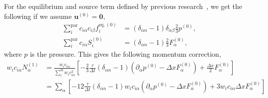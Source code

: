 \documentclass[fleqn,a4paper]{article} %
\numberwithin{equation}{section} %
\numberwithin{figure}{section} %
\numberwithin{table}{section} %
\numberwithin{algorithm}{section} %
\begin{document}
For the equilibrium and source term defined by previous research~\cite{saito_generalized_2023}, we get the following if we assume $\bm{u}^{(0)} = \bm{0}$,
\begin{equation}
\begin{split}
    \sum_i^\text{par}c_{i\alpha}c_{i\beta}f_i^{\text{eq},(0)} &= (\delta_{\alpha n} - 1)\delta_{\alpha\beta}\frac{2}{3}p^{(0)},\\
    \sum_i^\text{par}c_{i\alpha}S_i^{(0)} &= (\delta_{\alpha n} - 1)\frac{2}{3}F_\alpha^{(0)},
\end{split}
\end{equation}
where $p$ is the pressure. This gives the following momentum correction,
\begin{equation}
\begin{split}
    w_i c_{i\alpha}N_\alpha^{(1)} &= \frac{w_i c_{i\alpha}}{\sum_i^\text{in}w_i c_{i\alpha}^2}\left[ - \frac{2}{3}\frac{\tau}{\Delta t}(\delta_{\alpha n} - 1)\left(\partial_\alpha p^{(0)} - \Delta x F_\alpha^{(0)}\right)+ \frac{\Delta x}{2}F_\alpha^{(0)}\right]\\
    &= \sum_\alpha \left[-12\frac{\tau}{\Delta t}(\delta_{\alpha n} - 1)w_i c_{i\alpha}\left(\partial_\alpha p^{(0)}- \Delta xF_\alpha^{(0)}\right) + 3 w_i c_{i\alpha}\Delta xF_\alpha^{(0)}\right]
\end{split}
\end{equation}

\clearpage %
\printbibliography{}
\end{document}
